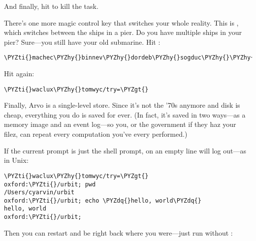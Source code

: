 And finally, hit  to kill the task.

There's one more magic control key that switches your whole
reality.  This is , which switches between the ships in a pier.
Do you have multiple ships in your pier?  Sure---you still have
your old submarine.  Hit :

\begin{framed_shaded}
\begin{Verbatim}[fontsize=\relsize{-2.5},fontseries=b,commandchars=\\\{\}]
\PYZti{}machec\PYZhy{}binnev\PYZhy{}dordeb\PYZhy{}sogduc\PYZhy{}\PYZhy{}dosmul\PYZhy{}sarrum\PYZhy{}faplec\PYZhy{}nidted/try=\PYZgt{}
\end{Verbatim}
\end{framed_shaded}

Hit  again:

\begin{framed_shaded}
\begin{Verbatim}[fontsize=\relsize{-2.5},fontseries=b,commandchars=\\\{\}]
\PYZti{}waclux\PYZhy{}tomwyc/try=\PYZgt{}
\end{Verbatim}
\end{framed_shaded}

Finally, Arvo is a single-level store.  Since it's not the '70s
anymore and disk is cheap, everything you do is saved for ever.
(In fact, it's saved in two ways---as a memory image and an event
log---so you, or the government if they haz your filez, can
repeat every computation you've every performed.)

If the current prompt is just the shell prompt,  on an empty
line will log out---as in Unix:

\begin{framed_shaded}
\begin{Verbatim}[fontsize=\relsize{-2.5},fontseries=b,commandchars=\\\{\}]
\PYZti{}waclux\PYZhy{}tomwyc/try=\PYZgt{}
oxford:\PYZti{}/urbit; pwd
/Users/cyarvin/urbit
oxford:\PYZti{}/urbit; echo \PYZdq{}hello, world\PYZdq{}
hello, world
oxford:\PYZti{}/urbit;
\end{Verbatim}
\end{framed_shaded}

Then you can restart and be right back where you were---just
run  without :

